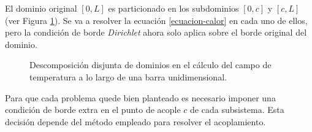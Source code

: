 El dominio original $[0,L]$ es particionado en los subdominios $[0,c]$ y $[c,L]$ (ver Figura \ref{temp-ej}).
Se va a resolver la ecuación \ref{ecuacion-calor} en cada uno de ellos, pero la condición de borde \textit{Dirichlet} ahora solo aplica sobre el borde original del dominio.

\begin{figure}
\centering{}
\caption[Descomposición disjunta de dominios en el cálculo del campo de temperatura a lo largo de una barra unidimensional]
{Descomposición disjunta de dominios en el cálculo del campo de temperatura a lo largo de una barra unidimensional.}
\label{temp-ej}
\end{figure}

Para que cada problema quede bien planteado es necesario imponer una condición de borde extra en el punto de acople $c$ de cada subsistema.
Esta decisión depende del método empleado para resolver el acoplamiento.

